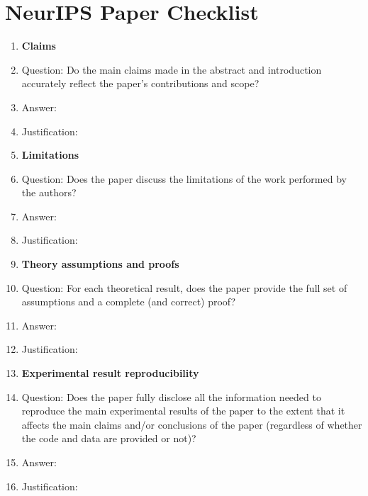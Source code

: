 \documentclass{article}
\begin{document}
\newpage %

\section*{NeurIPS Paper Checklist}


\begin{enumerate}

\item {\bf Claims}
    \item[] Question: Do the main claims made in the abstract and introduction accurately reflect the paper's contributions and scope?
    \item[] Answer: \answerTODO{} %
    \item[] Justification: \justificationTODO{} %

\item {\bf Limitations}
    \item[] Question: Does the paper discuss the limitations of the work performed by the authors?
    \item[] Answer: \answerTODO{} %
    \item[] Justification: \justificationTODO{}

\item {\bf Theory assumptions and proofs}
    \item[] Question: For each theoretical result, does the paper provide the full set of assumptions and a complete (and correct) proof?
    \item[] Answer: \answerTODO{} %
    \item[] Justification: \justificationTODO{}

    \item {\bf Experimental result reproducibility}
    \item[] Question: Does the paper fully disclose all the information needed to reproduce the main experimental results of the paper to the extent that it affects the main claims and/or conclusions of the paper (regardless of whether the code and data are provided or not)?
    \item[] Answer: \answerTODO{} %
    \item[] Justification: \justificationTODO{}


\end{enumerate}
\end{document}
